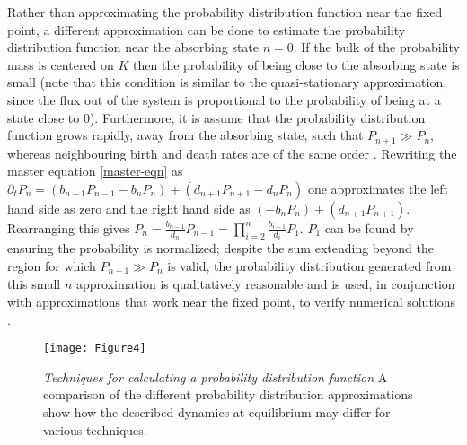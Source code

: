Rather than approximating the probability distribution function near the fixed point, a different approximation can be done to estimate the probability distribution function near the absorbing state $n=0$. %
If the bulk of the probability mass is centered on $K$ then the probability of being close to the absorbing state is small (note that this condition is similar to the quasi-stationary approximation, since the flux out of the system is proportional to the probability of being at a state close to $0$). 
Furthermore, it is assume that the probability distribution function grows rapidly, away from the absorbing state, such that $P_{n+1}\gg P_n$, whereas neighbouring birth and death rates are of the same order \cite{smalln}. 
Rewriting the master equation \ref{master-eqn} as $\partial_t P_n = \left(b_{n-1} P_{n-1} - b_n P_n \right) + \left(d_{n+1}P_{n+1} - d_n P_n\right)$ one approximates the left hand side as zero and the right hand side as $\left(-b_n P_n \right) + \left( d_{n+1} P_{n+1}\right)$. 
Rearranging this gives $P_n = \frac{b_{n-1}}{d_n}P_{n-1} = \prod_{i=2}^n \frac{b_{i-1}}{d_i} P_{1}$. %
$P_{1}$ can be found by ensuring the probability is normalized; despite the sum extending beyond the region for which $P_{n+1}\gg P_n$ is valid, the probability distribution generated from this small $n$ approximation is qualitatively reasonable and is used, in conjunction with approximations that work near the fixed point, to verify numerical solutions \cite{Ovaskainen?}. 

\begin{figure}[ht!]
	\centering
	\texttt{[image: Figure4]}
	\caption{\emph{Techniques for calculating a probability distribution function} A comparison of the different probability distribution approximations show how the described dynamics at equilibrium may differ for various techniques.} \label{pdf_techn}
\end{figure}

